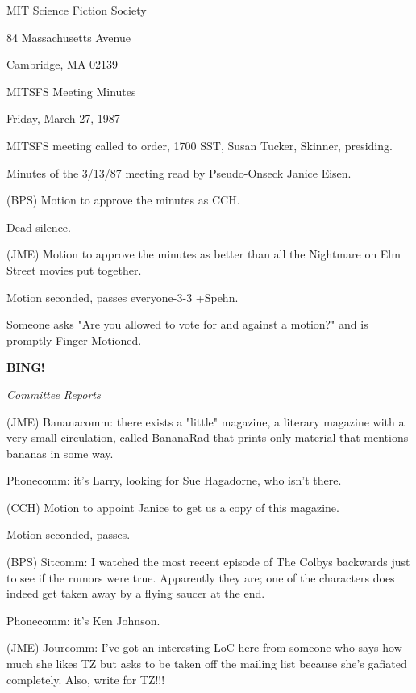 \documentclass[12pt]{article}
\newcommand{\bing}{{\bf BING!} }
\newcommand{\goto}[1]{\bing \vskip 12pt \centerline{{\em{#1}}}}
\begin{document}
\begin{center}

MIT Science Fiction Society 

84 Massachusetts Avenue

Cambridge, MA 02139

\vspace{12pt}

MITSFS Meeting Minutes 

Friday, March 27, 1987

\end{center}
 
\vspace{18pt}

\setlength{\parskip}{6pt}

\noindent
MITSFS meeting called to order, 1700 SST,
Susan Tucker, Skinner, presiding.

Minutes of the 3/13/87 meeting read by Pseudo-Onseck Janice Eisen.

(BPS) Motion to approve the minutes as CCH.

Dead silence.

(JME) Motion to approve the minutes as better than all the Nightmare on Elm Street movies put together.

Motion seconded, passes everyone-3-3 +Spehn.

Someone asks "Are you allowed to vote for and against a motion?" and is promptly Finger Motioned.

\goto{Committee Reports}

(JME) Bananacomm: there exists a "little" magazine, a literary magazine with a very small circulation, called BananaRad that prints only material that mentions bananas in some way.

Phonecomm: it's Larry, looking for Sue Hagadorne, who isn't there.

(CCH) Motion to appoint Janice to get us a copy of this magazine.

Motion seconded, passes.

(BPS) Sitcomm: I watched the most recent episode of The Colbys backwards just to see if the rumors were true. Apparently they are; one of the characters does indeed get taken away by a flying saucer at the end.

Phonecomm: it's Ken Johnson.

(JME) Jourcomm: I've got an interesting LoC here from someone who says how much she likes TZ but asks to be taken off the mailing list because she's gafiated completely. Also, write for TZ!!!
\end{document}
